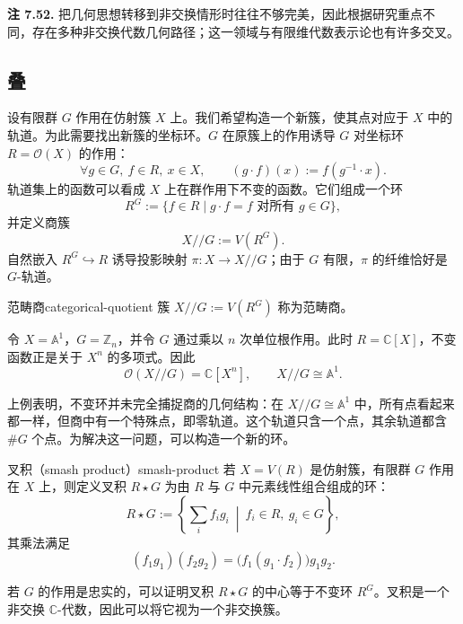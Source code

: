 \begin{note}\label{note:noncommutative-geometry-approaches}
\textbf{注 7.52.} 把几何思想转移到非交换情形时往往不够完美，因此根据研究重点不同，存在多种非交换代数几何路径；这一领域与有限维代数表示论也有许多交叉。
\end{note}

\subsection{叠}\label{subsec:stacks}
设有限群 $G$ 作用在仿射簇 $X$ 上。我们希望构造一个新簇，使其点对应于 $X$ 中的轨道。为此需要找出新簇的坐标环。$G$ 在原簇上的作用诱导 $G$ 对坐标环 $R=\mathcal O(X)$ 的作用：
\[
  \forall g\in G,\ f\in R,\ x\in X,\qquad
  (g\cdot f)(x):=f(g^{-1}\cdot x).
\]
轨道集上的函数可以看成 $X$ 上在群作用下不变的函数。它们组成一个环
\[
  R^G:=\{f\in R\mid g\cdot f=f\text{ 对所有 }g\in G\},
\]
并定义商簇
\[
  X//G:=V(R^G).
\]
自然嵌入 $R^G\hookrightarrow R$ 诱导投影映射 $\pi\colon X\to X//G$；由于 $G$ 有限，$\pi$ 的纤维恰好是 $G$-轨道。

\begin{definition}{范畴商}{categorical-quotient}
簇 $X//G:=V(R^G)$ 称为范畴商。
\end{definition}

\begin{example}[单位根作用的商]
令 $X=\mathbb A^1$，$G=\mathbb Z_n$，并令 $G$ 通过乘以 $n$ 次单位根作用。此时 $R=\mathbb C[X]$，不变函数正是关于 $X^n$ 的多项式。因此
\[
  \mathcal O(X//G)=\mathbb C[X^n],\qquad X//G\cong\mathbb A^1.
\]
\end{example}

上例表明，不变环并未完全捕捉商的几何结构：在 $X//G\cong\mathbb A^1$ 中，所有点看起来都一样，但商中有一个特殊点，即零轨道。这个轨道只含一个点，其余轨道都含 $\#G$ 个点。为解决这一问题，可以构造一个新的环。

\begin{definition}{叉积（smash product）}{smash-product}
若 $X=V(R)$ 是仿射簇，有限群 $G$ 作用在 $X$ 上，则定义叉积 $R\star G$ 为由 $R$ 与 $G$ 中元素线性组合组成的环：
\[
  R\star G:=\left\{\sum_i f_i g_i\ \middle|\ f_i\in R,\ g_i\in G\right\},
\]
其乘法满足
\[
  (f_1g_1)(f_2g_2)=\bigl(f_1(g_1\cdot f_2)\bigr)g_1g_2.
\]
\end{definition}

若 $G$ 的作用是忠实的，可以证明叉积 $R\star G$ 的中心等于不变环 $R^G$。叉积是一个非交换 $\mathbb C$-代数，因此可以将它视为一个非交换簇。


